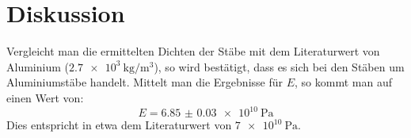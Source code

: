
\section{Diskussion}
\label{sec:Diskussion}

Vergleicht man die ermittelten Dichten der Stäbe mit dem Literaturwert von Aluminium ($\SI{2,7e3}{\kilogram\per\cubic\metre}$), so wird bestätigt, dass es sich bei den Stäben um Aluminiumstäbe handelt.
Mittelt man die Ergebnisse für $E$, so kommt man auf einen Wert von:
\[
	E=\SI{6.85(3)e10}{\pascal}
\]
Dies entspricht in etwa dem Literaturwert von $\SI{7e10}{\pascal}$.
